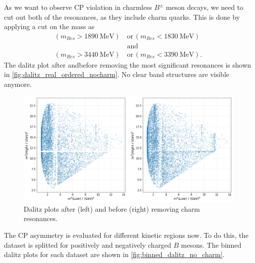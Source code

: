 As we want to observe CP violation in charmless $B^{\pm}$ meson decays, we need to cut out both of the resonances, as they include charm quarks. This is done by applying a cut on the mass as 
\begin{align*}
  (m_{Res} > \qty{1890}{\mega\electronvolt}) \, &\mathrm{or} \, (m_{Res} < \qty{1830}{\mega\electronvolt})\\
  &\mathrm{and} \\
  (m_{Res} > \qty{3440}{\mega\electronvolt}) \, &\mathrm{or} \, (m_{Res} < \qty{3390}{\mega\electronvolt}).
\end{align*}
The dalitz plot after andbefore removing the most significant resonances is shown in \autoref{fig:dalitz_real_ordered_nocharm}. No clear band structures are visible anymore.
\begin{figure}
  \centering
  \includegraphics[width = .95\textwidth]{"content/pics/dalitz_real_ordered_no_charm.png"}
  \caption{Dalitz plots after (left) and before (right) removing charm resonances.}
  \label{fig:dalitz_real_ordered_nocharm}
\end{figure}
The CP asymmetry is evaluated for different kinetic regions now. To do this, the dataset is splitted for positively and negatively charged $B$ mesons. The binned dalitz plots for each dataset are shown in \autoref{fig:binned_dalitz_no_charm}.
